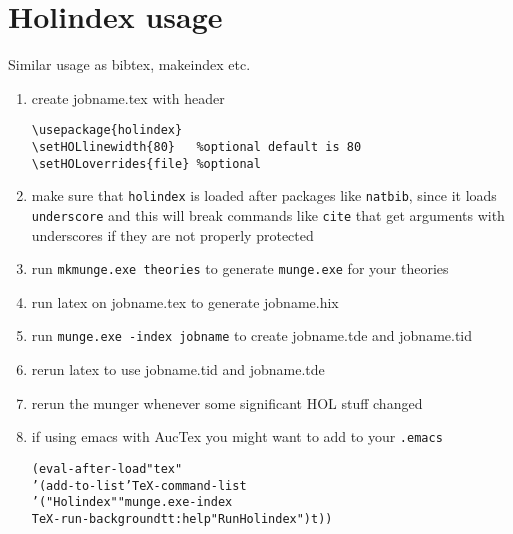 \documentclass{scrartcl}
\begin{document}
\section{Holindex usage}

Similar usage as bibtex, makeindex etc.

\begin{enumerate}
\item create jobname.tex with header
\begin{verbatim}
\usepackage{holindex}
\setHOLlinewidth{80}   %optional default is 80
\setHOLoverrides{file} %optional 
\end{verbatim}
\item make sure that \texttt{holindex} is loaded after packages like
  \texttt{natbib}, since it loads \texttt{underscore} and this will
  break commands like \texttt{cite} that get arguments with
  underscores if they are not properly protected
\item run \texttt{mkmunge.exe theories} to generate \texttt{munge.exe}
  for your theories
\item run latex on jobname.tex to generate jobname.hix
\item run \texttt{munge.exe -index jobname} to create jobname.tde and jobname.tid
\item rerun latex to use jobname.tid and jobname.tde
\item rerun the munger whenever some significant HOL stuff changed
\item if using emacs with AucTex you might want to add to your \texttt{.emacs}
\begin{alltt}
(eval-after-load "tex"
  '(add-to-list 'TeX-command-list
    '("Holindex" "munge.exe -index %s" 
       TeX-run-background t t :help "Run Holindex") t))
\end{alltt}
\end{enumerate}
\end{document}
